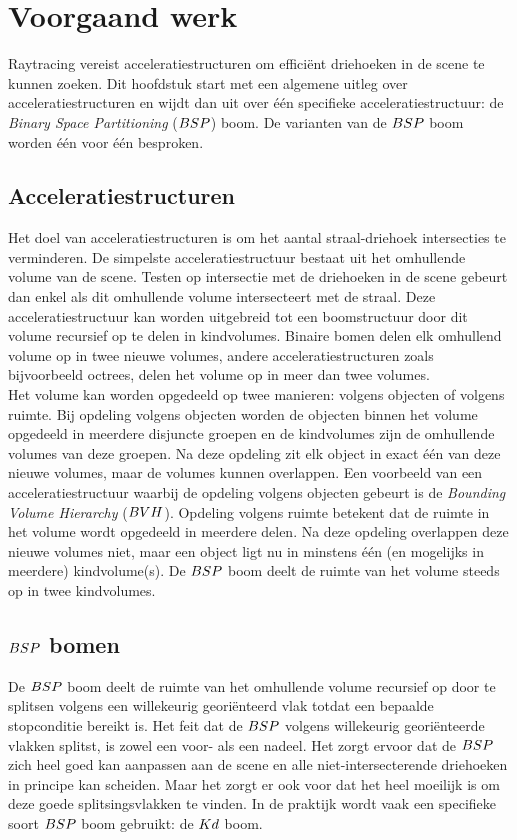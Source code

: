 \chapter{Voorgaand werk}
\label{hoofdstuk:voorgaand-werk}
Raytracing vereist acceleratiestructuren om efficiënt driehoeken in de scene te kunnen zoeken.
Dit hoofdstuk start met een algemene uitleg over acceleratiestructuren en wijdt dan uit over één specifieke acceleratiestructuur: de \textit{Binary Space Partitioning} ($BSP$) boom.
De varianten van de $BSP$ boom worden één voor één besproken.

\section{Acceleratiestructuren}
    Het doel van acceleratiestructuren is om het aantal straal-driehoek intersecties te verminderen.
    De simpelste acceleratiestructuur bestaat uit het omhullende volume van de scene.
    Testen op intersectie met de driehoeken in de scene gebeurt dan enkel als dit omhullende volume intersecteert met de straal.
    Deze acceleratiestructuur kan worden uitgebreid tot een boomstructuur door dit volume recursief op te delen in kindvolumes.
    Binaire bomen delen elk omhullend volume op in twee nieuwe volumes, andere acceleratiestructuren zoals bijvoorbeeld octrees, delen het volume op in meer dan twee volumes.
    \\

    Het volume kan worden opgedeeld op twee manieren: volgens objecten of volgens ruimte.
    Bij opdeling volgens objecten worden de objecten binnen het volume opgedeeld in meerdere disjuncte groepen en de kindvolumes zijn de omhullende volumes van deze groepen.
    Na deze opdeling zit elk object in exact één van deze nieuwe volumes, maar de volumes kunnen overlappen.
    Een voorbeeld van een acceleratiestructuur waarbij de opdeling volgens objecten gebeurt is de \textit{Bounding Volume Hierarchy} ($BVH$).
    Opdeling volgens ruimte betekent dat de ruimte in het volume wordt opgedeeld in meerdere delen.
    Na deze opdeling overlappen deze nieuwe volumes niet, maar een object ligt nu in minstens één (en mogelijks in meerdere) kindvolume(s).
    De $BSP$ boom deelt de ruimte van het volume steeds op in twee kindvolumes.

\section{$BSP$ bomen}
    De $BSP$ boom deelt de ruimte van het omhullende volume recursief op door te splitsen volgens een willekeurig georiënteerd vlak totdat een bepaalde stopconditie bereikt is.
    Het feit dat de $BSP$ volgens willekeurig georiënteerde vlakken splitst, is zowel een voor- als een nadeel.
    Het zorgt ervoor dat de $BSP$ zich heel goed kan aanpassen aan de scene en alle niet-intersecterende driehoeken in principe kan scheiden.
    Maar het zorgt er ook voor dat het heel moeilijk is om deze goede splitsingsvlakken te vinden.
    In de praktijk wordt vaak een specifieke soort $BSP$ boom gebruikt: de $Kd$ boom.
    
